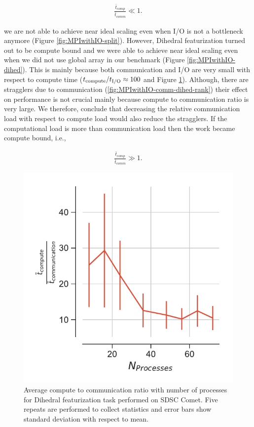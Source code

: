 \begin{gather*}
  \frac{\bar{t}_{comp}}{\bar{t}_{comm}} \ll 1.
\end{gather*}

we are not able to achieve near ideal scaling even when I/O is not a bottleneck anymore (Figure \ref{fig:MPIwithIO-split}).
However, Dihedral featurization turned out to be compute bound and we were able to achieve near ideal scaling even when we did not use global array in our benchmark (Figure \ref{fig:MPIwithIO-dihed}).
This is mainly because both communication and I/O are very small with respect to compute time (${t}_{\text{compute}}/{t}_{\text{I/O}} \approx 100$ and Figure \ref{fig:tcomp_tcomm_ratio_dihed}). 
Although, there are stragglers due to communication (\ref{fig:MPIwithIO-comm-dihed-rank}) their effect on performance is not crucial mainly because compute to communication ratio is very large. 
We therefore, conclude that decreasing the relative communication load with respect to compute load would also reduce the stragglers. 
If the computational load is more than communication load then the work became compute bound, i.e.,

\begin{gather*}
  \frac{\bar{t}_{comp}}{\bar{t}_{comm}} \gg 1.
\end{gather*}

\begin{figure}[ht!]
\centering
  \includegraphics[width=0.4\linewidth]{figures/tcomp_tcomm_ratio_dihed.pdf}
\caption{Average compute to communication ratio with number of processes for Dihedral featurization task performed on SDSC Comet.
Five repeats are performed to collect statistics and error bars show standard deviation with respect to mean.}
\label{fig:tcomp_tcomm_ratio_dihed}
\end{figure}


